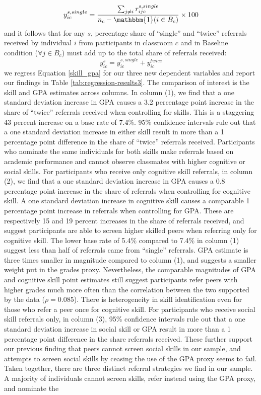 \documentclass[11pt,a4paper,oneside]{article}
\begin{document}
\begin{equation}\label{single_def}
  y_{ic}^{s,single} = \frac{\sum_{j \neq i} r_{ijc}^{s,single}}{n_c - \mathbbm{1}(i \in B_c)} \times 100
  \end{equation}
and it follows that for any $s$, percentage share of ``single'' and ``twice'' referrals received by individual $i$ from participants in classroom $c$ and in Baseline condition ($\forall j \in B_c$) must add up to the total share of referrals received:
\begin{equation}\label{single_twice}
  y_{ic}^{s} = y_{ic}^{s,single} + y_{ic}^{twice}
  \end{equation}
we regress Equation \ref{skill_gpa} for our three new dependent variables and report our findings in Table \ref{tab:regression-results3}. The comparison of interest is the skill and GPA estimates across columns. In column (1), we find that a one standard deviation increase in GPA causes a 3.2 percentage point increase in the share of ``twice'' referrals received when controlling for skills. This is a staggering 43 percent increase on a base rate of 7.4\%. 95\% confidence intervals rule out that a one standard deviation increase in either skill result in more than a 1 percentage point difference in the share of ``twice'' referrals received. Participants who nominate the same individuals for both skills make referrals based on academic performance and cannot observe classmates with higher cognitive or social skills. For participants who receive only cognitive skill referrals, in column (2), we find that a one standard deviation increase in GPA causes a 0.8 percentage point increase in the share of referrals when controlling for cognitive skill. A one standard deviation increase in cognitive skill causes a comparable 1 percentage point increase in referrals when controlling for GPA. These are respectively 15 and 19 percent increases in the share of referrals received, and suggest participants are able to screen higher skilled peers when referring only for cognitive skill. The lower base rate of 5.4\% compared to 7.4\% in column (1) suggest less than half of referrals came from ``single'' referrals. GPA estimate is three times smaller in magnitude compared to column (1), and suggests a smaller weight put in the grades proxy. Nevertheless, the comparable magnitudes of GPA and cognitive skill point estimates still suggest participants refer peers with higher grades much more often than the correlation between the two supported by the data ($\rho = 0.085$). There is heterogeneity in skill identification even for those who refer a peer once for cognitive skill. For participants who receive social skill referrals only, in column (3), 95\% confidence intervals rule out that a one standard deviation increase in social skill or GPA result in more than a 1 percentage point difference in the share referrals received. These further support our previous finding that peers cannot screen social skills in our sample, and attempts to screen social skills by ceasing the use of the GPA proxy seems to fail. Taken together, there are three distinct referral strategies we find in our sample. A majority of individuals cannot screen skills, refer instead using the GPA proxy, and nominate the 
\end{document}

